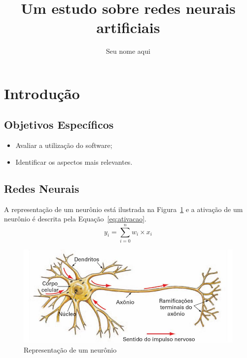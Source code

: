 \documentclass[twocolumn, a4paper, 12pt]{article}
\author{Seu nome aqui}
\title{Um estudo sobre redes neurais artificiais}
\begin{document}
	\maketitle
\section{Introdução}
\subsection{Objetivos Específicos}
\begin{itemize}
	\item Avaliar a utilização do software;
	\item Identificar os aspectos mais relevantes.
\end{itemize}
\subsection{Redes Neurais}
A representação de um neurônio está ilustrada na Figura~\ref{fig:neuronio} e a ativação de um neurônio é descrita pela Equação~\ref{eq:ativacao}.
\begin{equation}
y_i = \sum_{i=0}^{n} w_i \times x_i
\end{equation}\label{eq:ativacao}

\begin{figure}[htb]
	\centering
	\includegraphics[scale=.3]{neuronio}
	\caption{Representação de um neurônio}\label{fig:neuronio}
\end{figure}
\lipsum
\end{document}
